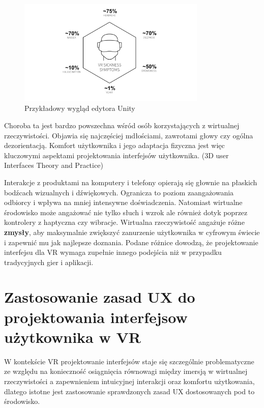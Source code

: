 \begin{figure}[!htb]
    \centering
    \includegraphics[width=0.8\textwidth]{images/VRSICK.png}
    \caption{Przykładowy wygląd edytora Unity}
    \label{unity_engine_example}
\end{figure}

Choroba ta jest bardzo powszechna wśród osób korzystających z wirtualnej rzeczywistości. Objawia się najczęściej mdłościami, zawrotami głowy czy ogólna dezorientacją. \textbf{}{Komfort użytkownika i jego adaptacja fizyczna} jest więc kluczowymi aspektami projektowania interfejsów użytkownika. (3D user Interfaces Theory and Practice)

Interakcje z produktami na komputery i telefony opierają się głownie na płaskich bodźcach wizualnych i dźwiękowych. Ogranicza to poziom zaangażowania odbiorcy i wpływa na mniej intensywne doświadczenia. Natomiast wirtualne środowisko może angażować nie tylko słuch i wzrok ale również dotyk poprzez kontrolery z haptyczna czy wibracje. Wirtualna rzeczywistość angażuje różne \textbf{zmysły}, aby maksymalnie zwiększyć zanurzenie użytkownika w cyfrowym świecie i zapewnić mu jak najlepsze doznania. Podane różnice dowodzą, że projektowanie interfejsu dla VR wymaga zupełnie innego podejścia niż w przypadku tradycyjnych gier i aplikacji. 


\section{Zastosowanie zasad UX do projektowania interfejsow  użytkownika w VR}

W kontekście VR projektowanie interfejsów staje się szczególnie problematyczne ze względu na konieczność osiągnięcia równowagi między imersją w wirtualnej rzeczywistości a zapewnieniem intuicyjnej interakcji oraz komfortu użytkowania, dlatego istotne jest zastosowanie sprawdzonych zasad UX dostosowanych pod to środowisko.

